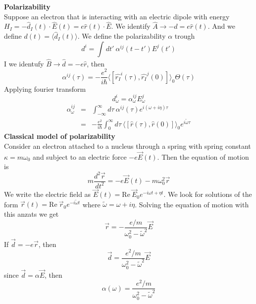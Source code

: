 \documentclass[12pt,a4paper]{article}
\newcommand{\integral}[3]{\int_{#1}^{#2} d #3 \ } %
\begin{document}
\textbf{Polarizability}\\
Suppose an electron that is interacting with an electric dipole with energy $H_I = -\hat{d}_I(t) \cdot \hat{E}(t) = e\hat{r}(t)\cdot\hat{E}$. We identify $\hat{A}\rightarrow -\hat{d}= e\hat{r}(t)$. And we define $d(t) = \langle \hat{d}_I(t) \rangle$. We define the polarizability $\alpha$ trough
\begin{equation}
	d^i = \integral{}{}{t'} \alpha^{ij}(t-t')E^j(t')
\end{equation}
I we identufy $\hat{B} \rightarrow \hat{d}=-e\hat{r}$, then
 \begin{equation}
 	\alpha^{ij}(\tau) = -\frac{e^2}{i\hbar}\langle [\hat{r_I}^i(\tau),\hat{r_I}^j(0)]\rangle_0 \Theta(\tau)
 \end{equation}
Applying fourier transform
\begin{equation}
	d_{\omega}^i = \alpha_{\omega}^{ij} E_{\omega}^j
\end{equation}
\begin{eqnarray}
	\alpha_{\omega}^{ij} & = & \integral{-\infty}{\infty}{\tau} \alpha^{ij}(\tau) e^{i(\omega+i\eta)\tau}\\
	& = & -\frac{e^2}{i\hbar}\integral{0}{\infty}{\tau} \langle [\hat{r}(\tau),\hat{r}(0)]\rangle_0 e^{i\tilde \omega \tau}
\end{eqnarray}
\textbf{Classical model of polarizability}\\
Consider an electron attached to a nucleus through a spring with spring constant $\kappa = m\omega_0$ and subject to an electric force $-e\vec{E}(t) $. Then the equation of motion is
\begin{equation}
	m\frac{d^2 \vec{r}}{dt^2} = - e\vec{E}(t)-m\omega_0^2\vec{r}
\end{equation}
We write the electric field as $\vec{E}(t) = \text{Re} \ \vec{E}_0 e^{-i\omega t + \eta t}$. We look for solutions of the form $\vec{r}(t) = \text{Re} \  \vec{r}_0 e^{-i\tilde\omega t}$ where $\tilde{\omega} = \omega + i\eta$. Solving the equation of motion with this anzats we get
\begin{equation}
	\vec{r} = -\frac{e/m}{\omega_0^2 - \tilde{\omega}^2}\vec{E}
\end{equation}
If $\vec{d} = -e\vec{r}$, then
\begin{equation}
	\vec{d} = \frac{e^2/m}{\omega_0^2 - \tilde{\omega}^2}\vec{E}
\end{equation}
since $\vec{d} = \alpha \vec{E}$, then
\begin{equation}
	\alpha(\omega) = \frac{e^2/m}{\omega_0^2 - \tilde{\omega}^2}
\end{equation}
\end{document}
